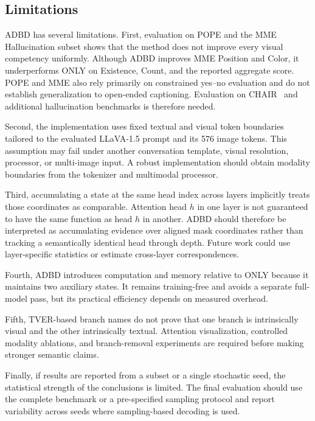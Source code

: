 \subsection{Limitations}
\label{sec:limitations}

ADBD has several limitations. First, evaluation on POPE and the MME Hallucination subset shows that the method does not improve every visual competency uniformly. Although ADBD improves MME Position and Color, it underperforms ONLY on Existence, Count, and the reported aggregate score. POPE and MME also rely primarily on constrained yes--no evaluation and do not establish generalization to open-ended captioning. Evaluation on CHAIR~\cite{rohrbach2018object} and additional hallucination benchmarks is therefore needed.

Second, the implementation uses fixed textual and visual token boundaries tailored to the evaluated LLaVA-1.5 prompt and its 576 image tokens. This assumption may fail under another conversation template, visual resolution, processor, or multi-image input. A robust implementation should obtain modality boundaries from the tokenizer and multimodal processor.

Third, accumulating a state at the same head index across layers implicitly treats those coordinates as comparable. Attention head $h$ in one layer is not guaranteed to have the same function as head $h$ in another. ADBD should therefore be interpreted as accumulating evidence over aligned mask coordinates rather than tracking a semantically identical head through depth. Future work could use layer-specific statistics or estimate cross-layer correspondences.

Fourth, ADBD introduces computation and memory relative to ONLY because it maintains two auxiliary states. It remains training-free and avoids a separate full-model pass, but its practical efficiency depends on measured overhead.

Fifth, TVER-based branch names do not prove that one branch is intrinsically visual and the other intrinsically textual. Attention visualization, controlled modality ablations, and branch-removal experiments are required before making stronger semantic claims.

Finally, if results are reported from a subset or a single stochastic seed, the statistical strength of the conclusions is limited. The final evaluation should use the complete benchmark or a pre-specified sampling protocol and report variability across seeds where sampling-based decoding is used.
